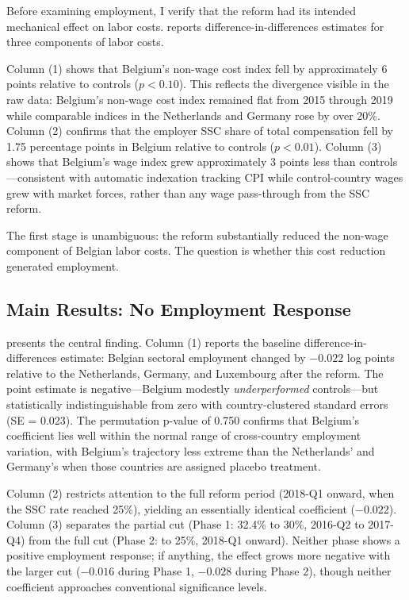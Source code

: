 \documentclass[12pt]{article}
\begin{document}
Before examining employment, I verify that the reform had its intended mechanical effect on labor costs.  reports difference-in-differences estimates for three components of labor costs.



Column (1) shows that Belgium's non-wage cost index fell by approximately 6 points relative to controls ($p < 0.10$). This reflects the divergence visible in the raw data: Belgium's non-wage cost index remained flat from 2015 through 2019 while comparable indices in the Netherlands and Germany rose by over 20\%. Column (2) confirms that the employer SSC share of total compensation fell by 1.75 percentage points in Belgium relative to controls ($p < 0.01$). Column (3) shows that Belgium's wage index grew approximately 3 points less than controls---consistent with automatic indexation tracking CPI while control-country wages grew with market forces, rather than any wage pass-through from the SSC reform.

The first stage is unambiguous: the reform substantially reduced the non-wage component of Belgian labor costs. The question is whether this cost reduction generated employment.

\subsection{Main Results: No Employment Response}



 presents the central finding. Column (1) reports the baseline difference-in-differences estimate: Belgian sectoral employment changed by $-0.022$ log points relative to the Netherlands, Germany, and Luxembourg after the reform. The point estimate is negative---Belgium modestly \textit{underperformed} controls---but statistically indistinguishable from zero with country-clustered standard errors (SE = 0.023). The permutation p-value of 0.750 confirms that Belgium's coefficient lies well within the normal range of cross-country employment variation, with Belgium's trajectory less extreme than the Netherlands' and Germany's when those countries are assigned placebo treatment.

Column (2) restricts attention to the full reform period (2018-Q1 onward, when the SSC rate reached 25\%), yielding an essentially identical coefficient ($-0.022$). Column (3) separates the partial cut (Phase 1: 32.4\% to 30\%, 2016-Q2 to 2017-Q4) from the full cut (Phase 2: to 25\%, 2018-Q1 onward). Neither phase shows a positive employment response; if anything, the effect grows more negative with the larger cut ($-0.016$ during Phase 1, $-0.028$ during Phase 2), though neither coefficient approaches conventional significance levels.
\end{document}
